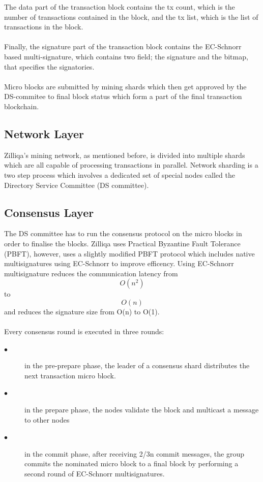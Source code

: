 \documentclass[a4paper,twoside,phd]{BYUPhys}
\begin{document}
The data part of the transaction block contains the tx count, which is the number of transactions contained in the block, and the tx list, which is the list of transactions in the block.
\\
\\
Finally, the signature part of the transaction block contains the EC-Schnorr based multi-signature, which contains two field; the signature and the bitmap, that specifies the signatories.  
\\
\\
Micro blocks are submitted by mining shards which then get approved by the DS-commitee to final block status which form a part of the final transaction blockchain.
\subsection{Network Layer}
 Zilliqa's mining network, as mentioned before, is divided into multiple shards which are all capable of processing transactions in parallel. Network sharding is a two step process which involves a dedicated set of special nodes called the Directory Service Committee (DS committee). 
\subsection{Consensus Layer}
The DS committee has to run the consensus protocol on the micro blocks in order to finalise the blocks. Zilliqa uses Practical Byzantine Fault Tolerance (PBFT), however, uses a slightly modified PBFT protocol which includes native multisignatures using EC-Schnorr to improve efficency. Using EC-Schnorr multisignature reduces the communication latency from \[O(n^2)\] to \[O(n)\] and reduces the signature size from O(n) to O(1).
\\
\\
Every consensus round is executed in three rounds:
\begin{description}
\item[$\bullet$] in the pre-prepare phase, the leader of a consensus shard distributes the next transaction micro block.
\item[$\bullet$] in the prepare phase, the nodes validate the block and multicast a message to other nodes
\item[$\bullet$] in the commit phase, after receiving 2/3n commit messages, the group commits the nominated micro block to a final block by performing a second round of EC-Schnorr multisignatures.
\end{description}
\end{document}
